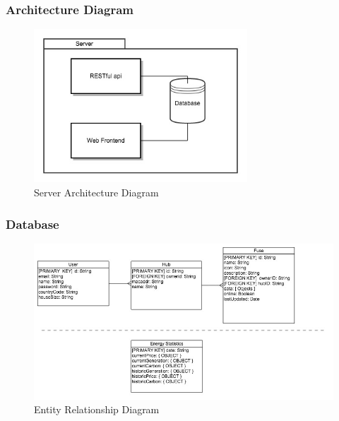 \documentclass[preprint,12pt,3p]{elsarticle}
\begin{document}
\subsubsection{Architecture Diagram}
\begin{figure}[H]
    \centering
    \includegraphics[width=8cm]{diagrams/server}
    \caption {Server Architecture Diagram}
\end{figure}

\subsubsection{Database}
\begin{figure}[H]
    \centering
    \includegraphics[width=\columnwidth]{diagrams/erd}
    \caption {Entity Relationship Diagram}
\end{figure}
\end{document}
